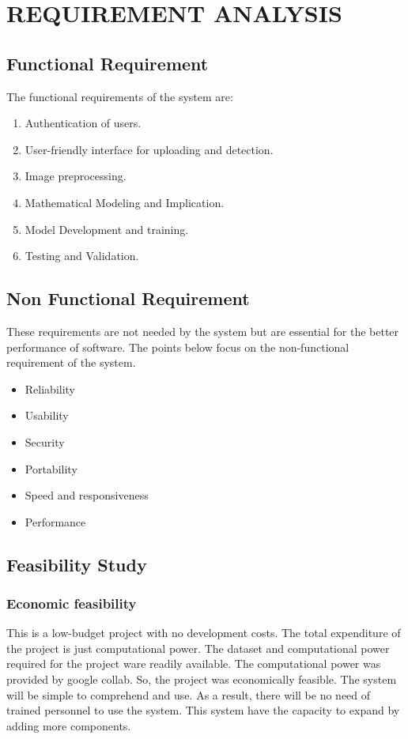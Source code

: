 
\section{REQUIREMENT ANALYSIS}

\subsection{Functional Requirement}
The functional requirements of the system are:
\begin{enumerate}
    \item Authentication of users.
    \item User-friendly interface for uploading and detection.
    \item Image preprocessing.
    \item Mathematical Modeling and Implication.
    \item Model Development and training.
    \item Testing and Validation.

\end{enumerate}

\subsection{Non Functional Requirement}
\justify
These requirements are not needed by the system but are essential for the better
performance of software. The points below focus on the non-functional requirement of
the system.
\begin{itemize}
    \item Reliability
    \item   Usability
    \item   Security
    \item   Portability
    \item   Speed and responsiveness
    \item  Performance
\end{itemize}

\subsection{Feasibility Study}

\subsubsection{Economic feasibility}
This is a low-budget project with no development costs. The total expenditure of the
project is just computational power. The dataset and computational power required for
the project ware readily available. The computational power was provided by google
collab. So, the project was economically feasible. The system will be simple to
comprehend and use. As a result, there will be no need of trained personnel to use the
system. This system have the capacity to expand by adding more components.

